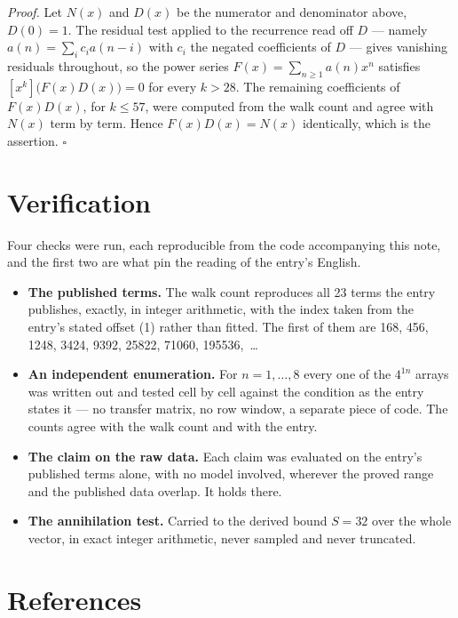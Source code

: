 \documentclass[11pt]{article}
\theoremstyle{definition}
\begin{document}
{\itshape Proof.} Let $N(x)$ and $D(x)$ be the numerator and denominator above, $D(0)=1$. The residual test applied to the recurrence read off $D$ --- namely $a(n) = \sum_i c_i a(n-i)$ with $c_i$ the negated coefficients of $D$ --- gives vanishing residuals throughout, so the power series $F(x)=\sum_{n\ge 1}a(n)x^n$ satisfies $[x^k]\bigl(F(x)D(x)\bigr) = 0$ for every $k > 28$. The remaining coefficients of $F(x)D(x)$, for $k \le 57$, were computed from the walk count and agree with $N(x)$ term by term. Hence $F(x)D(x) = N(x)$ identically, which is the assertion. $\square$

\section{Verification}

Four checks were run, each reproducible from the code accompanying this note, and the first two are what pin the reading of the entry's English.

\begin{itemize}

\item {\bfseries The published terms.} The walk count reproduces all 23 terms the entry publishes, exactly, in integer arithmetic, with the index taken from the entry's stated offset (1) rather than fitted. The first of them are 168, 456, 1248, 3424, 9392, 25822, 71060, 195536,~\dots

\item {\bfseries An independent enumeration.} For $n = 1,\dots,8$ every one of the $4^{1n}$ arrays was written out and tested cell by cell against the condition as the entry states it --- no transfer matrix, no row window, a separate piece of code. The counts agree with the walk count and with the entry.

\item {\bfseries The claim on the raw data.} Each claim was evaluated on the entry's published terms alone, with no model involved, wherever the proved range and the published data overlap. It holds there.

\item {\bfseries The annihilation test.} Carried to the derived bound $S = 32$ over the whole vector, in exact integer arithmetic, never sampled and never truncated.

\end{itemize}

\section{References}
\end{document}
